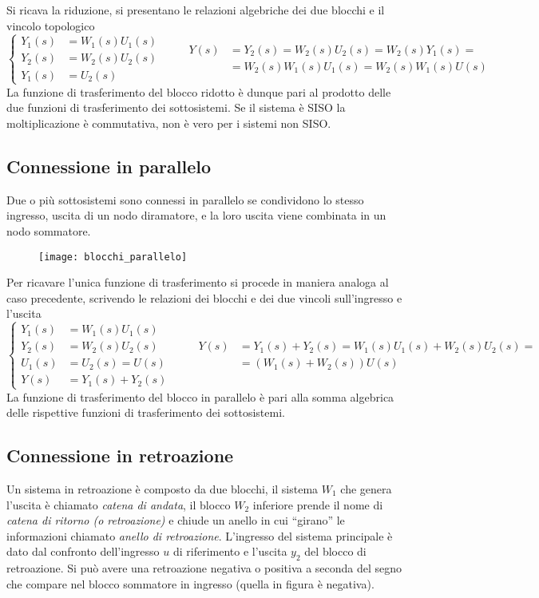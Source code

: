Si ricava la riduzione, si presentano le relazioni algebriche dei due blocchi e
il vincolo topologico
$$\left\{\begin{aligned}
Y_1(s) &= W_1(s)U_1(s) \\
Y_2(s) &= W_2(s) U_2(s) \\
Y_1(s) &= U_2(s)
\end{aligned}\right.
\qquad
\begin{aligned}
Y(s) &= Y_2(s) = W_2(s)U_2(s) = W_2(s)Y_1(s) =\\
&=W_2(s)W_1(s)U_1(s) = W_2(s)W_1(s)U(s)
\end{aligned}$$
La funzione di trasferimento del blocco ridotto è dunque pari al prodotto delle
due funzioni di trasferimento dei sottosistemi.
Se il sistema è SISO la moltiplicazione è commutativa, non è vero per i sistemi
non SISO.

\newpage
\subsection{Connessione in parallelo}
Due o più sottosistemi sono connessi in parallelo se condividono lo stesso
ingresso, uscita di un nodo diramatore, e la loro uscita viene combinata in un
nodo sommatore.
\begin{figure}[h]
\centering
\texttt{[image: blocchi\_parallelo]}
\end{figure}
Per ricavare l'unica funzione di trasferimento si procede in maniera analoga al
caso precedente, scrivendo le relazioni dei blocchi e dei due vincoli
sull'ingresso e l'uscita
$$
\left\{\begin{aligned}
Y_1(s) &= W_1(s) U_1(s) \\
Y_2(s) &= W_2(s) U_2(s) \\
U_1(s) &= U_2(s) = U(s) \\
Y(s) &= Y_1(s) + Y_2(s)
\end{aligned}\right.\qquad
\begin{aligned}
Y(s) & = Y_1(s) + Y_2(s) = W_1(s)U_1(s) + W_2(s) U_2(s) =\\
&=\left( W_1(s)+W_2(s)
\right) U(s)
\end{aligned}
$$
La funzione di trasferimento del blocco in parallelo è pari alla somma
algebrica delle rispettive funzioni di trasferimento dei sottosistemi.

\subsection{Connessione in retroazione}
Un sistema in retroazione è composto da due blocchi, il sistema $W_1$ che
genera l'uscita è chiamato \textit{catena di andata}, il blocco $W_2$ inferiore
prende il nome di \textit{catena di ritorno (o retroazione)} e chiude un anello
in cui ``girano'' le informazioni chiamato \textit{anello di retroazione}.
L'ingresso del sistema principale è dato dal confronto dell'ingresso $u$ di
riferimento e l'uscita $y_2$ del blocco di retroazione. Si può avere una
retroazione negativa o positiva a seconda del segno che compare nel blocco
sommatore in ingresso (quella in figura è negativa).

